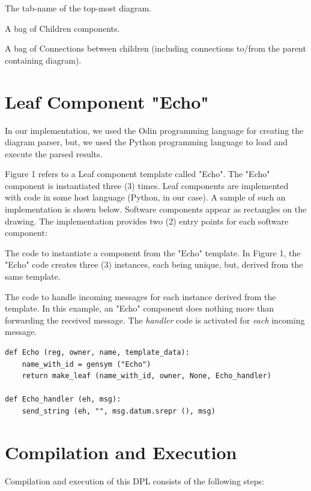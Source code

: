 \documentclass[10pt]{acmart}
\begin{document}
The tab-name of the top-most diagram.

A bag of Children components.

A bag of Connections between children (including connections to/from the parent containing diagram).

\section{Leaf Component "Echo"}
In our implementation, we used the Odin programming language for
creating the diagram parser, but, we used the Python programming
language to load and execute the parsed results.

Figure 1 refers to a Leaf component template called "Echo". The "Echo"
component is instantiated three (3) times. Leaf components are
implemented with code in some host language (Python, in our case). A
sample of such an implementation is shown below. Software components
appear as rectangles on the drawing. The implementation provides two (2)
entry points for each software component:

The code to instantiate a component from the "Echo" template. In Figure
1, the "Echo" code creates three (3) instances, each being unique, but,
derived from the same template.

The code to handle incoming messages for each instance derived from the
template. In this example, an "Echo" component does nothing more than
forwarding the received message. The \emph{handler} code is activated for
\emph{each} incoming message.

\begin{verbatim}
def Echo (reg, owner, name, template_data):
    name_with_id = gensym ("Echo")
    return make_leaf (name_with_id, owner, None, Echo_handler)

def Echo_handler (eh, msg):
    send_string (eh, "", msg.datum.srepr (), msg)
\end{verbatim}

\section{Compilation and Execution}
Compilation and execution of this DPL consists of the following steps:
\end{document}
